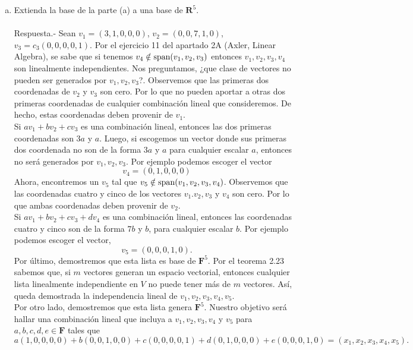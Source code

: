 \begin{enumerate}[\bfseries 1.]
\begin{enumerate}[a).]
	    \item Extienda la base de la parte (a) a una base de $\textbf{R}^5$.\\\\
		Respuesta.-\; Sean $v_1=(3,1,0,0,0)$, $v_2=(0,0,7,1,0)$, $v_3=c_3(0,0,0,0,1)$. Por el ejercicio 11 del apartado 2A (Axler, Linear Algebra), se sabe que si tenemos $v_4\notin \mathop{\mbox{\normalfont span}}\nolimits(v_1,v_2,v_3)$ entonces $v_1,v_2,v_3,v_4$ son linealmente independientes. Nos preguntamos, ¿que clase de vectores no pueden ser generados por $v_1,v_2,v_3$?. Observemos que las primeras dos coordenadas de $v_2$ y $v_3$ son cero. Por lo que no pueden aportar a otras dos primeras coordenadas de cualquier combinación lineal que consideremos. De hecho, estas coordenadas deben provenir de $v_1$.\\
		Si $av_1+bv_2+cv_3$ es una combinación lineal, entonces las dos primeras coordenadas son $3a$ y $a$. Luego, si escogemos un vector donde sus primeras dos coordenada no son de la forma $3a$ y $a$ para cualquier escalar $a$, entonces no será generados por $v_1,v_2,v_3$. Por ejemplo podemos escoger el vector 
		$$v_4=(0,1,0,0,0)$$
		Ahora, encontremos un $v_5$ tal que $v_5\notin \mathop{\mbox{\normalfont span}}\nolimits(v_1,v_2,v_3,v_4)$. Observemos que las coordenadas cuatro y cinco de los vectores $v_1.v_2,v_3$ y $v_4$ son cero. Por lo que ambas coordenadas deben provenir de $v_2$.\\
		Si  $av_1+bv_2+cv_3+dv_4$ es una combinación lineal, entonces las coordenadas cuatro y cinco son de la forma $7b$ y $b$, para cualquier escalar $b$. Por ejemplo podemos escoger el vector,
		$$v_5=(0,0,0,1,0).$$
		Por último, demostremos que esta lista es base de $\textbf{F}^5$. Por el teorema 2.23 sabemos que, si $m$ vectores generan un espacio vectorial, entonces cualquier lista linealmente independiente en $V$ no puede tener más de $m$ vectores. Así, queda demostrada la independencia lineal de $v_1,v_2,v_3,v_4,v_5$.\\

		Por otro lado, demostremos que esta lista genera $\textbf{F}^5$. Nuestro objetivo será hallar una combinación lineal que incluya a $v_1,v_2,v_3,v_4$ y $v_5$ para $a,b,c,d,e\in \textbf{F}$ tales que
		$$a(1,0,0,0,0)+b(0,0,1,0,0)+c(0,0,0,0,1)+d(0,1,0,0,0)+e(0,0,0,1,0)=(x_1,x_2,x_3,x_4,x_5).$$


\end{enumerate}
\end{enumerate}
